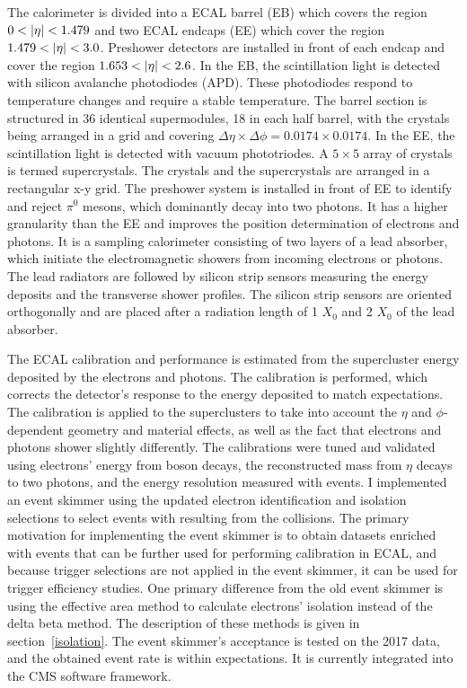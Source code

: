 The calorimeter is divided into a ECAL barrel (EB) which covers the region $0 < \lvert\eta\rvert < 1.479$ and two ECAL endcaps (EE) which cover the region $1.479 < \lvert\eta\rvert < 3.0$. Preshower detectors are installed in front of each endcap and cover the region $1.653 < \lvert\eta\rvert < 2.6$. In the EB, the scintillation light is detected with silicon avalanche photodiodes (APD). These photodiodes respond to temperature changes and require a stable temperature. The barrel section is structured in 36 identical supermodules, 18 in each half barrel, with the crystals being arranged in a grid and covering $\Delta \eta \times \Delta \phi = 0.0174 \times 0.0174$. In the EE, the scintillation light is detected with vacuum phototriodes. A $5 \times 5$ array of crystals is termed supercrystals. The crystals and the supercrystals are arranged in a rectangular x-y grid. The preshower system is installed in front of EE to identify and reject $\pi^0$ mesons, which dominantly decay into two photons. It has a higher granularity than the EE and improves the position determination of electrons and photons. It is a sampling calorimeter consisting of two layers of a lead absorber, which initiate the electromagnetic showers from incoming electrons or photons. The lead radiators are followed by silicon strip sensors measuring the energy deposits and the transverse shower profiles. The silicon strip sensors are oriented orthogonally and are placed after a radiation length of 1 $X_0$ and 2 $X_0$ of the lead absorber.

The ECAL calibration and performance is estimated from the supercluster energy deposited by the electrons and photons. The calibration is performed, which corrects the detector's response to the energy deposited to match expectations. The calibration is applied to the superclusters to take into account the $\eta$ and $\phi$-dependent geometry and material effects, as well as the fact that electrons and photons shower slightly differently. The calibrations were tuned and validated using electrons' energy from \PW boson decays, the reconstructed mass from $\eta$ decays to two photons, and the energy resolution measured with \Zee events. I implemented an event skimmer using the updated electron identification and isolation selections to select events with \Zee resulting from the \pp collisions. The primary motivation for implementing the event skimmer is to obtain datasets enriched with \Zee events that can be further used for performing calibration in ECAL, and because trigger selections are not applied in the event skimmer, it can be used for trigger efficiency studies. One primary difference from the old event skimmer is using the effective area method to calculate electrons' isolation instead of the delta beta method. The description of these methods is given in section~\ref{isolation}. The event skimmer's acceptance is tested on the 2017 data, and the obtained event rate is within expectations. It is currently integrated into the CMS software framework.

